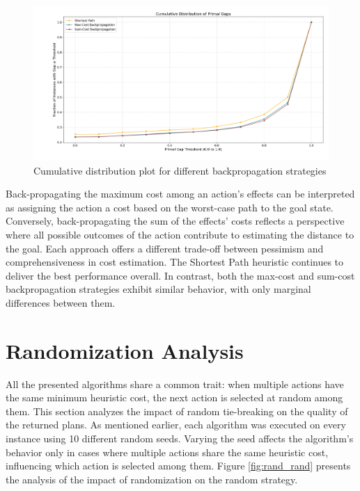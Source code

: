 \begin{figure}[ht]
	\centering
	\includegraphics[width=\textwidth]{images/algs456.png}
	\caption{Cumulative distribution plot for different backpropagation strategies}
	\label{fig:backprop}
\end{figure}

Back-propagating the maximum cost among an action’s effects can be interpreted as assigning the action a cost based on
the worst-case path to the goal state. Conversely, back-propagating the sum of the effects' costs reflects a perspective
where all possible outcomes of the action contribute to estimating the distance to the goal. Each approach offers a different
trade-off between pessimism and comprehensiveness in cost estimation.
The Shortest Path heuristic continues to deliver the best performance overall. In contrast, both the max-cost and sum-cost
backpropagation strategies exhibit similar behavior, with only marginal differences between them.

\section{Randomization Analysis}
All the presented algorithms share a common trait: when multiple actions have the same minimum heuristic cost,
the next action is selected at random among them.
This section analyzes the impact of random tie-breaking on the quality of the returned plans. As mentioned earlier,
each algorithm was executed on every instance using 10 different random seeds. Varying the seed affects the algorithm’s
behavior only in cases where multiple actions share the same heuristic cost, influencing which action is selected among them.
Figure \ref{fig:rand_rand} presents the analysis of the impact of randomization on the random strategy.

